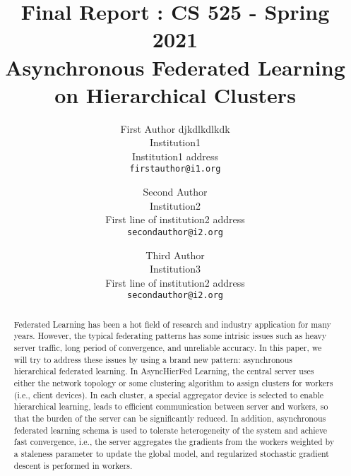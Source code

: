 \documentclass[10pt,twocolumn,letterpaper]{article}
\theoremstyle{definition}
\begin{document}
\title{Final Report : CS 525 - Spring 2021\\
Asynchronous Federated Learning on Hierarchical Clusters}

\author{First Author djkdlkdlkdk\\
Institution1\\
Institution1 address\\
{\tt\small firstauthor@i1.org}
\and
Second Author\\
Institution2\\
First line of institution2 address\\
{\tt\small secondauthor@i2.org}


\and
Third Author\\
Institution3\\
First line of institution2 address\\
{\tt\small secondauthor@i2.org}
}

\maketitle

\begin{abstract}
Federated Learning has been a hot field of research and industry application for many years. However, the typical federating patterns has some intrisic issues such as heavy server traffic, long period of convergence, and unreliable accuracy. In this paper, we will try to address these issues by using a brand new pattern: asynchronous hierarchical federated learning. In AsyncHierFed Learning, the central server uses either the network topology or some clustering algorithm to assign clusters for workers (i.e., client devices). In each cluster, a special aggregator device is selected to enable hierarchical learning, leads to efficient communication between server and workers, so that the burden of the server can be significantly reduced. In addition, asynchronous federated learning schema is used to tolerate heterogeneity of the system and achieve fast convergence, i.e., the server aggregates the gradients from the workers weighted by a staleness parameter to update the global model, and regularized stochastic gradient descent is performed in workers. 
\end{abstract}
\end{document}
